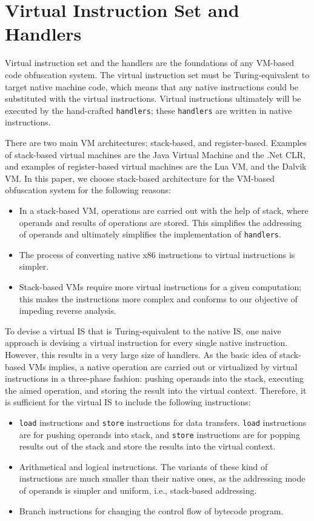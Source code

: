\section{Virtual Instruction Set and Handlers}\label{sec:VIS-Handlers}
Virtual instruction set and the handlers are the foundations of any VM-based code obfuscation system. 
The virtual instruction set must be Turing-equivalent to target native machine code, 
which means that any native instructions could be substituted with the virtual instructions. 
Virtual instructions ultimately will be executed by the hand-crafted \texttt{handlers}; 
these \texttt{handlers} are written in native instructions.

There are two main VM architectures: stack-based, and register-based. Examples of stack-based virtual machines are the Java Virtual Machine and the .Net CLR, and examples of register-based virtual machines are the Lua VM, and the Dalvik VM. In this paper, we choose stack-based architecture for the VM-based obfuscation system for the following reasons:
\begin{itemize}
  \item In a stack-based VM, operations are carried out with the help of stack, where operands and results of operations are stored. This simplifies the addressing of operands and ultimately simplifies the implementation of \texttt{handlers}.
  \item The process of converting native x86 instructions to virtual instructions is simpler.
  \item Stack-based VMs require more virtual instructions for a given computation; this makes the instructions more complex and conforms to our objective of impeding reverse analysis.
\end{itemize}

To devise a virtual IS that is Turing-equivalent to the native IS, one naive approach is devising a virtual instruction for every single native instruction. However, this results in a very large size of handlers. As the basic idea of stack-based VMs implies, a native operation are carried out or virtualized by virtual instructions in a three-phase fashion: pushing operands into the stack, executing the aimed operation, and storing the result into the virtual context. Therefore, it is sufficient for the virtual IS to include the following instructions:
\begin{itemize}
  \item \texttt{load} instructions and \texttt{store} instructions for data transfers. \texttt{load} instructions are for pushing operands into stack, and \texttt{store} instructions are for popping results out of the stack and store the results into the virtual context.
  \item Arithmetical and logical instructions. The variants of these kind of instructions are much smaller than their native ones, as the addressing mode of operands is simpler and uniform, i.e., stack-based addressing.
  \item Branch instructions for changing the control flow of bytecode program.
\end{itemize}

